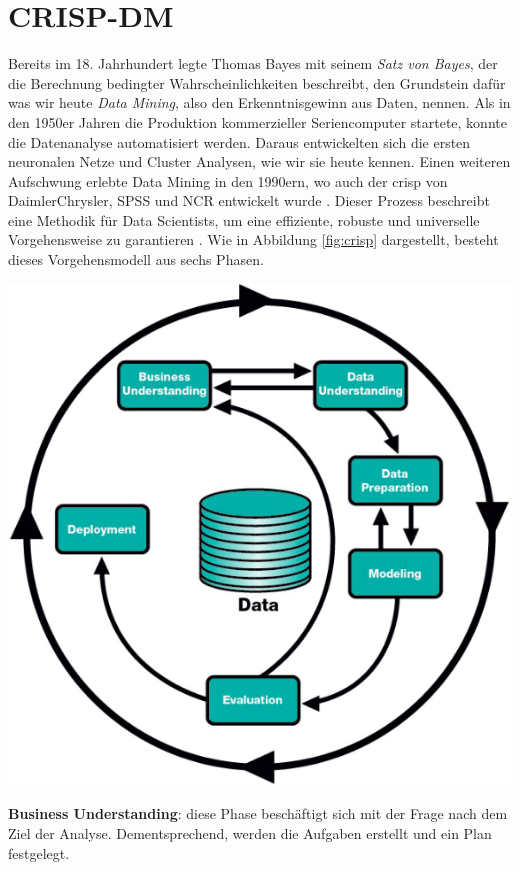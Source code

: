 \documentclass[
    12pt, %
    DIV10,
    ngerman, %
    a4paper, %
    oneside, %
    titlepage, %
    parskip=half, %
    headings=normal, %
    listof=totoc, %
    bibliography=totoc, %
    index=totoc, %
    captions=tableheading, %
    final %
]{scrreprt}
\begin{document}
\section{CRISP-DM}
\label{sec:crisp}
Bereits im 18. Jahrhundert legte Thomas Bayes mit seinem \emph{Satz von Bayes}, der die Berechnung bedingter Wahrscheinlichkeiten beschreibt, den Grundstein dafür was wir heute \emph{Data Mining}, also den Erkenntnisgewinn aus Daten, nennen. Als in den 1950er Jahren die Produktion kommerzieller Seriencomputer startete, konnte die Datenanalyse automatisiert werden. Daraus entwickelten sich die ersten neuronalen Netze und Cluster Analysen, wie wir sie heute kennen. Einen weiteren Aufschwung erlebte Data Mining in den 1990ern, wo auch der \ac{crisp} von DaimlerChrysler, SPSS und NCR entwickelt wurde \parencite{SmartVisionEurop}.
Dieser Prozess beschreibt eine Methodik für Data Scientists, um eine effiziente, robuste und universelle Vorgehensweise zu garantieren \parencite{chapman1999crisp}. Wie in Abbildung \ref{fig:crisp} dargestellt, besteht dieses Vorgehensmodell aus sechs Phasen.
\begin{center}
\includegraphics[scale=0.5]{img/crisp.png}
\label{fig:crisp}
\end{center}
\textbf{Business Understanding}: diese Phase beschäftigt sich mit der Frage nach dem Ziel der Analyse. Dementsprechend, werden die Aufgaben erstellt und ein Plan festgelegt.\\
\end{document}
